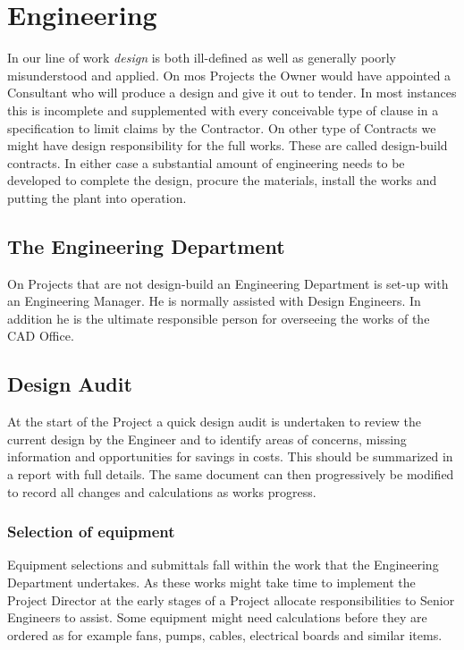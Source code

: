 \chapter{Engineering}

In our line of work \textit{design} is both ill-defined as well as generally poorly
misunderstood and applied. On mos Projects the Owner would have appointed a
Consultant who will produce a design and give it out to tender. In most instances
this is incomplete and supplemented with every conceivable type of clause in a
specification to limit claims by the Contractor. On other type of Contracts we
might have design responsibility for the full works. These are called design-build contracts. In either case a substantial amount of engineering needs to be developed
to complete the design, procure the materials, install the works and putting the
plant into operation.



\section*{The Engineering Department}

On Projects that are not design-build an Engineering Department is set-up with
an Engineering Manager. He is normally assisted with Design Engineers. In addition
he is the ultimate responsible person for overseeing the works of the CAD Office.

\section{Design Audit}

At the start of the Project a quick design audit is undertaken to review the
current design by the Engineer and to identify areas of concerns, missing information and opportunities for savings in costs. This should be summarized in a report with
full details. The same document can then progressively be modified to record all
changes and calculations as works progress.

\subsection*{Selection of equipment}

Equipment selections and submittals fall within the work that the Engineering Department undertakes. As these works might take time to implement the Project Director at the early stages of a Project allocate responsibilities to Senior
Engineers to assist. Some equipment might need calculations before they are ordered as for example fans, pumps, cables, electrical boards and similar items.


